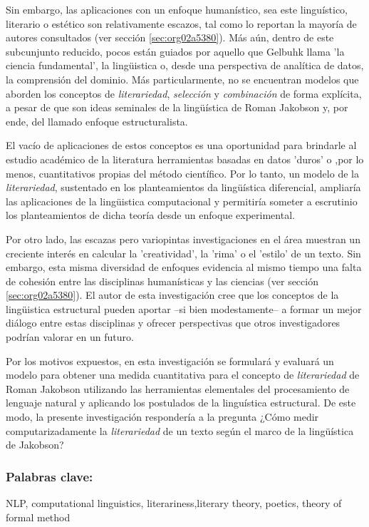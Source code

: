 \documentclass[12pt,letterpaper,twoside]{article}
\begin{document}
Sin embargo, las aplicaciones con un enfoque humanístico, sea este
linguístico, literario o estético son relativamente escazos, tal como
lo reportan la mayoría de autores consultados (ver sección \ref{sec:org02a5380}).  Más aún, dentro de este subcunjunto reducido, pocos
están guiados por aquello que Gelbuhk llama 'la ciencia fundamental',
la lingüistica o, desde una perspectiva de analítica de datos, la
comprensión del dominio. Más particularmente, no se encuentran modelos
que aborden los conceptos de \emph{literariedad}, \emph{selección} y \emph{combinación}
de forma explícita, a pesar de que son ideas seminales de la lingüística
de Roman Jakobson y, por ende, del llamado enfoque estructuralista.

El vacío de aplicaciones de estos conceptos es una oportunidad para
brindarle al estudio académico de la literatura herramientas basadas
en datos 'duros' o ,por lo menos, cuantitativos propias del método
científico. Por lo tanto, un modelo de la \emph{literariedad}, sustentado
en los planteamientos da lingüística diferencial, ampliaría las
aplicaciones de la lingüistica computacional y permitiría someter a
escrutinio los planteamientos de dicha teoría desde un enfoque
experimental.

Por otro lado, las escazas pero variopintas investigaciones en el área
muestran un creciente interés en calcular la 'creatividad', la 'rima'
o el 'estilo' de un texto. Sin embargo, esta misma diversidad de
enfoques evidencia al mismo tiempo una falta de cohesión entre las
disciplinas humanísticas y las ciencias (ver sección \ref{sec:org02a5380}). El autor de esta investigación cree que los conceptos de
la lingüistica estructural pueden aportar --si bien modestamente-- a
formar un mejor diálogo entre estas disciplinas y ofrecer perspectivas
que otros investigadores podrían valorar en un futuro.

Por los motivos expuestos, en esta investigación se formulará y
evaluará un modelo para obtener una medida cuantitativa para el
concepto de \emph{literariedad} de Roman Jakobson utilizando las
herramientas elementales del procesamiento de lenguaje natural y
aplicando los postulados de la linguística estructural. De este modo,
la presente investigación respondería a la pregunta ¿Cómo medir
computarizadamente la \emph{literariedad} de un texto según el marco de la
lingüística de Jakobson?

\subsubsection{\textbf{Palabras clave:}}
\label{sec:orgeb83c06}
NLP, computational linguistics, literariness,literary theory, poetics, theory of formal method
\end{document}
